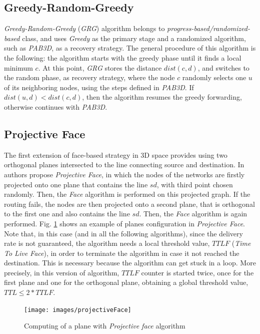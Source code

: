 \documentclass[journal,comsoc]{IEEEtran}
\begin{document}
\subsection{Greedy-Random-Greedy}
\emph{Greedy-Random-Greedy} (\emph{GRG}) algorithm belongs to \emph{progress-based/randomized-based} class, and uses \emph{Greedy} as the primary stage and a randomized algorithm, such as \emph{PAB3D}, as a recovery strategy. The general procedure of this algorithm is the following: the algorithm starts with the greedy phase until it finds a local minimum \(c\). At this point, \emph{GRG} stores the distance \(dist(c, d)\), and switches to the random phase, as recovery strategy, where the node \(c\) randomly selects one \(u\) of its neighboring nodes, using the steps defined in \emph{PAB3D}. If \(dist(u, d) < dist(c, d)\), then the algorithm resumes the greedy forwarding, otherwise continues with \emph{PAB3D}.

\subsection{Projective Face}
The first extension of face-based strategy in 3D space provides using two orthogonal planes intersected to the line connecting source and destination. In \cite{kao:3d} authors propose \emph{Projective Face}, in which the nodes of the networks are firstly projected onto one plane that contains the line \(sd\), with third point chosen randomly. Then, the \emph{Face} algorithm is performed on this projected graph. If the routing fails, the nodes are then projected onto a second plane, that is orthogonal to the first one and also contains the line \(sd\). Then, the \emph{Face} algorithm is again performed. Fig. \ref{fig:projectiveFace} shows an example of planes configuration in \emph{Projective Face}. Note that, in this case (and in all the following algorithms), since the delivery rate is not guaranteed, the algorithm needs a local threshold value, \(TTLF\) (\emph{Time To Live Face}), in order to terminate the algorithm in case it not reached the destination. This is necessary because the algorithm can get stuck in a loop. More precisely, in this version of algorithm, \(TTLF\) counter is started twice, once for the first plane and one for the orthogonal plane, obtaining a global threshold value, \(TTL \leq 2*TTLF\).

\begin{figure}[!t]
\centering
\texttt{[image: images/projectiveFace]}
\caption{Computing of a plane with \emph{Projective face} algorithm}
  \label{fig:projectiveFace}
\end{figure}
\end{document}
